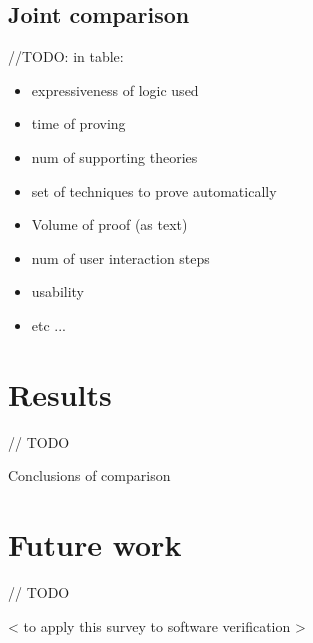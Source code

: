 \documentclass[article]{aaltoseries}
\begin{document}

\subsection{Joint comparison}
\label{sec:joint_comparison}

//TODO: in table:
\begin{itemize}
\itemsep0em
	\item expressiveness of logic used
	\item time of proving
	\item num of supporting theories
	\item set of techniques to prove automatically
	\item Volume of proof (as text)
	\item num of user interaction steps
	\item usability
	\item etc ...
\end{itemize}


\section{Results}
\label{sec:results}

// TODO

Conclusions of comparison


\section{Future work}
\label{sec:future_work}

// TODO

< to apply this survey to software verification >






\end{document}
